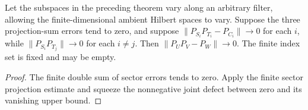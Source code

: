 \begin{lemma}
    \label{thm:sector_projection_defect_limit}
    \leanok
    Let the subspaces in the preceding theorem vary along an arbitrary
    filter, allowing the finite-dimensional ambient Hilbert spaces to vary.
    Suppose the three projection-sum errors tend to zero, and suppose
    $\|P_{S_i}P_{T_i}-P_{C_i}\|\to0$ for each $i$, while
    $\|P_{S_i}P_{T_j}\|\to0$ for each $i\ne j$.
    Then $\|P_UP_V-P_W\|\to0$.
    The finite index set is fixed and may be empty.
\end{lemma}
\begin{proof}\leanok
    The finite double sum of sector errors tends to zero.
    Apply the finite sector projection estimate and squeeze the nonnegative
    joint defect between zero and its vanishing upper bound.
\end{proof}

